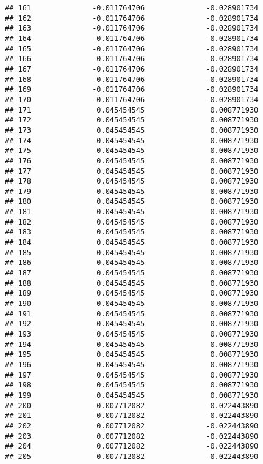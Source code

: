 \documentclass[]{article}
\begin{document}
\begin{verbatim}
## 161              -0.011764706              -0.028901734
## 162              -0.011764706              -0.028901734
## 163              -0.011764706              -0.028901734
## 164              -0.011764706              -0.028901734
## 165              -0.011764706              -0.028901734
## 166              -0.011764706              -0.028901734
## 167              -0.011764706              -0.028901734
## 168              -0.011764706              -0.028901734
## 169              -0.011764706              -0.028901734
## 170              -0.011764706              -0.028901734
## 171               0.045454545               0.008771930
## 172               0.045454545               0.008771930
## 173               0.045454545               0.008771930
## 174               0.045454545               0.008771930
## 175               0.045454545               0.008771930
## 176               0.045454545               0.008771930
## 177               0.045454545               0.008771930
## 178               0.045454545               0.008771930
## 179               0.045454545               0.008771930
## 180               0.045454545               0.008771930
## 181               0.045454545               0.008771930
## 182               0.045454545               0.008771930
## 183               0.045454545               0.008771930
## 184               0.045454545               0.008771930
## 185               0.045454545               0.008771930
## 186               0.045454545               0.008771930
## 187               0.045454545               0.008771930
## 188               0.045454545               0.008771930
## 189               0.045454545               0.008771930
## 190               0.045454545               0.008771930
## 191               0.045454545               0.008771930
## 192               0.045454545               0.008771930
## 193               0.045454545               0.008771930
## 194               0.045454545               0.008771930
## 195               0.045454545               0.008771930
## 196               0.045454545               0.008771930
## 197               0.045454545               0.008771930
## 198               0.045454545               0.008771930
## 199               0.045454545               0.008771930
## 200               0.007712082              -0.022443890
## 201               0.007712082              -0.022443890
## 202               0.007712082              -0.022443890
## 203               0.007712082              -0.022443890
## 204               0.007712082              -0.022443890
## 205               0.007712082              -0.022443890

\end{verbatim}
\end{document}
